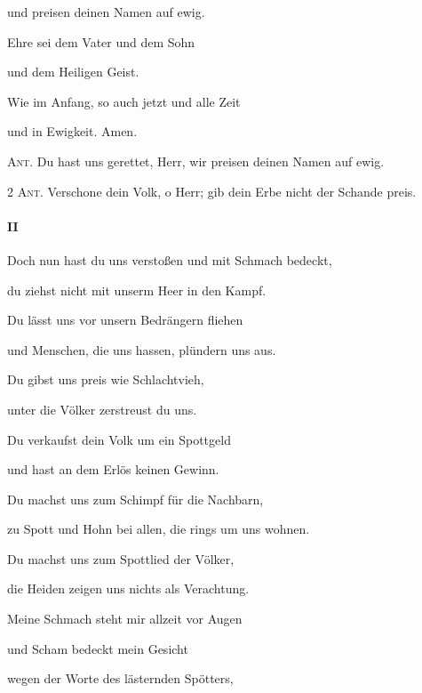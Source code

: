 und preisen deinen Namen auf ewig.

\noindent Ehre sei dem Vater und dem Sohn~\GreStar{}~\nopagebreak

und dem Heiligen Geist.

\noindent Wie im Anfang, so auch jetzt und alle Zeit~\GreStar{}~\nopagebreak

und in Ewigkeit. Amen.

\vspace{10pt}

\noindent \textsc{Ant.} Du hast uns gerettet, Herr, wir preisen deinen Namen auf ewig. 


\newpage

\noindent \textsc{2 Ant.} Verschone dein Volk, o Herr; gib dein Erbe nicht der Schande preis.

\paragraph{II}

\noindent Doch nun hast du uns verstoßen und mit Schmach bedeckt,~\GreStar{}~\nopagebreak

du ziehst nicht mit unserm Heer in den Kampf. 

 \noindent Du lässt uns vor unsern Bedrängern fliehen~\GreStar{}~\nopagebreak

und Menschen, die uns hassen, plündern uns aus. 

 \noindent Du gibst uns preis wie Schlachtvieh,~\GreStar{}~\nopagebreak

unter die Völker zerstreust du uns. 

 \noindent Du verkaufst dein Volk um ein Spottgeld~\GreStar{}~\nopagebreak

und hast an dem Erlös keinen Gewinn. 

 \noindent Du machst uns zum Schimpf für die Nachbarn,~\GreStar{}~\nopagebreak

zu Spott und Hohn bei allen, die rings um uns wohnen.

\noindent Du machst uns zum Spottlied der Völker,~\GreStar{}~\nopagebreak

die Heiden zeigen uns nichts als Verachtung.

\noindent Meine Schmach steht mir allzeit vor Augen~\GreStar{}~\nopagebreak

und Scham bedeckt mein Gesicht

\noindent wegen der Worte des lästernden Spötters,~\GreStar{}~\nopagebreak

